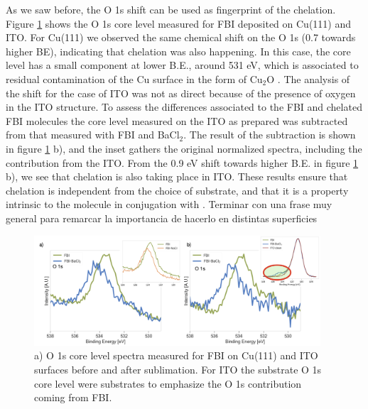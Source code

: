 \documentclass[aps,prl,reprint,longbibliography,superscriptaddress, english]{revtex4-1}
\newcommand{\completar}[1]{{\color{red} #1}}
\begin{document}
As we saw before, the O 1s shift can be used as fingerprint of the chelation. Figure \ref{XPS_FBI_Cu_ITO} shows the O 1s core level measured for FBI deposited on Cu(111) and ITO. For Cu(111) we observed the same chemical shift on the O 1s (0.7 towards higher BE), indicating that chelation was also happening. In this case, the core level has a small component at lower B.E., around 531 eV, which is associated to residual contamination of the Cu surface in the form of Cu$_2$O \cite{zhu_surface_2013}.
The analysis of the shift for the case of ITO was not as direct because of the presence of oxygen in the ITO structure. To assess the differences associated to the FBI and chelated FBI molecules the core level measured on the ITO as prepared  was subtracted from that measured with FBI and BaCl$_2$. The result of the subtraction is shown in figure \ref{XPS_FBI_Cu_ITO} b), and the inset gathers the original normalized spectra, including the contribution from the ITO. From the 0.9 eV shift towards higher B.E. in figure \ref{XPS_FBI_Cu_ITO} b), we see that chelation is also taking place in ITO. These results ensure that chelation is independent from the choice of substrate, and that it is a property intrinsic to the molecule in conjugation with \Bapp. 
\completar{Terminar con una frase muy general para remarcar la importancia de hacerlo en distintas superficies}  


\begin{figure}[ht!]
	\includegraphics[width=0.95\textwidth]{figures/fig5_cu_ito.png}
	\caption{\label{XPS_FBI_Cu_ITO} 
    a) O 1s core level spectra measured for FBI on Cu(111) and ITO surfaces before and after \Bapp sublimation. For ITO the substrate O 1s core level were substrates to emphasize the O 1s contribution coming from FBI.}
\end{figure}  
\end{document}
